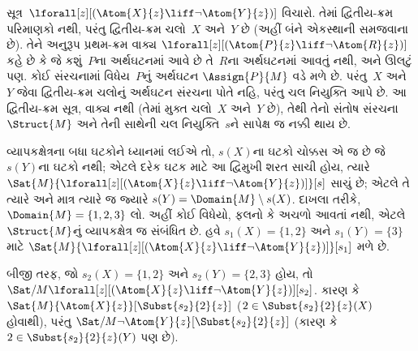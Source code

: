 \begin{ex}
  સૂત્ર~$\lforall[z][(\Atom{X}{z} \liff \lnot
    \Atom{Y}{z})]$ વિચારો. તેમાં દ્વિતીય-ક્રમ પરિમાણકો નથી, પરંતુ
  દ્વિતીય-ક્રમ ચલો~$X$ અને~$Y$ છે (અહીં બંને એકસ્થાની
  સમજવાના છે). તેને અનુરૂપ પ્રથમ-ક્રમ વાક્ય
  $\lforall[z][(\Atom{P}{z} \liff \lnot \Atom{R}{z})]$ કહે છે કે
  જે કશું~$P$ના અર્થઘટનમાં આવે છે તે~$R$ના અર્થઘટનમાં આવતું નથી,
  અને ઊલટું પણ. કોઈ સંરચનામાં વિધેય~$P$નું અર્થઘટન
  $\Assign{P}{M}$ વડે મળે છે. પરંતુ~$X$ અને~$Y$ જેવા દ્વિતીય-ક્રમ
  ચલોનું અર્થઘટન સંરચના પોતે નહિ, પરંતુ
  ચલ નિયુક્તિ આપે છે. આ દ્વિતીય-ક્રમ સૂત્ર,
  વાક્ય નથી (તેમાં મુક્ત ચલો~$X$ અને~$Y$ છે), તેથી
  તેનો સંતોષ સંરચના~$\Struct{M}$ અને તેની સાથેની
  ચલ નિયુક્તિ~$s$ને સાપેક્ષ જ નક્કી થાય છે.

  વ્યાપકક્ષેત્રના બધા ઘટકોને ધ્યાનમાં લઈએ તો, $s(X)$ના ઘટકો
  ચોક્કસ એ જ છે જે $s(Y)$ના ઘટકો નથી; એટલે દરેક ઘટક માટે આ
  દ્વિમુખી શરત સાચી હોય,
  ત્યારે $\Sat{M}{\lforall[z][(\Atom{X}{z} \liff \lnot
  \Atom{Y}{z})]}[s]$ સાચું છે; એટલે તે ત્યારે અને માત્ર ત્યારે જ
  જ્યારે $s(Y) = \Domain{M} \setminus s(X)$.
  દાખલા તરીકે,
  $\Domain{M} = \{1, 2, 3\}$ લો. અહીં કોઈ વિધેયો,
  ફલનો કે અચળો આવતાં નથી, એટલે
  $\Struct{M}$નું વ્યાપકક્ષેત્ર જ સંબંધિત છે. હવે
  $s_1(X) = \{1, 2\}$ અને $s_1(Y) = \{3\}$ માટે
  $\Sat{M}{\lforall[z][(\Atom{X}{z}
      \liff \lnot \Atom{Y}{z})]}[s_1]$ મળે છે.

  બીજી તરફ, જો $s_2(X) = \{1, 2\}$ અને $s_2(Y) = \{2, 3\}$ હોય,
  તો $\Sat/{M}{\lforall[z][(\Atom{X}{z} \liff \lnot
      \Atom{Y}{z})]}[s_2]$. કારણ કે
  $\Sat{M}{\Atom{X}{z}}[\Subst{s_2}{2}{z}]$ ($2 \in \Subst{s_2}{2}{z}(X)$ હોવાથી),
  પરંતુ $\Sat/{M}{\lnot \Atom{Y}{z}}[\Subst{s_2}{2}{z}]$
  (કારણ કે $2 \in \Subst{s_2}{2}{z}(Y)$ પણ છે).
\end{ex}

